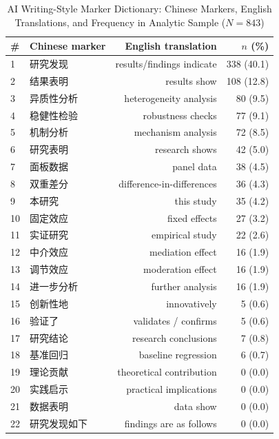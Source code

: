 \documentclass[12pt,a4paper]{article}
\begin{document}
\begin{table}[htbp]
\centering
\caption{AI Writing-Style Marker Dictionary: Chinese Markers,
         English Translations, and Frequency in Analytic Sample
         ($N = 843$)}
\label{tab:markers}
\begin{threeparttable}
\small
\begin{tabular}{llrr}
\toprule
\# & Chinese marker & English translation & $n$ (\%) \\
\midrule
1  & 研究发现  & results/findings indicate & 338 (40.1) \\
2  & 结果表明  & results show              & 108 (12.8) \\
3  & 异质性分析 & heterogeneity analysis   &  80 (9.5)  \\
4  & 稳健性检验 & robustness checks        &  77 (9.1)  \\
5  & 机制分析  & mechanism analysis        &  72 (8.5)  \\
6  & 研究表明  & research shows            &  42 (5.0)  \\
7  & 面板数据  & panel data                &  38 (4.5)  \\
8  & 双重差分  & difference-in-differences &  36 (4.3)  \\
9  & 本研究    & this study                &  35 (4.2)  \\
10 & 固定效应  & fixed effects             &  27 (3.2)  \\
11 & 实证研究  & empirical study           &  22 (2.6)  \\
12 & 中介效应  & mediation effect          &  16 (1.9)  \\
13 & 调节效应  & moderation effect         &  16 (1.9)  \\
14 & 进一步分析 & further analysis         &  16 (1.9)  \\
15 & 创新性地  & innovatively              &   5 (0.6)  \\
16 & 验证了    & validates / confirms      &   5 (0.6)  \\
17 & 研究结论  & research conclusions      &   7 (0.8)  \\
18 & 基准回归  & baseline regression       &   6 (0.7)  \\
19 & 理论贡献  & theoretical contribution  &   0 (0.0)  \\
20 & 实践启示  & practical implications    &   0 (0.0)  \\
21 & 数据表明  & data show                 &   0 (0.0)  \\
22 & 研究发现如下 & findings are as follows &  0 (0.0)  \\

\end{tabular}
\end{threeparttable}
\end{table}
\end{document}
